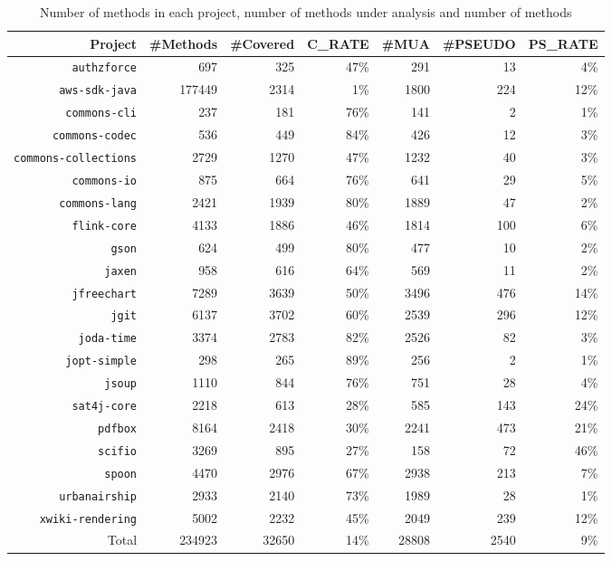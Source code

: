 \begin{table}
	\caption{Number of methods in each project, number of methods under analysis and number of \pseudotested{} methods}
	\label{tab:testedclass}
	\def\arraystretch{1}%
	\setlength\tabcolsep{1.2pt} %
	\begin{tabular}{rrrrrrr}
			\hline
			Project & {\#Methods} & {\#Covered} & C\_RATE & {\#MUA} & {\#PSEUDO}  & PS\_RATE  \\
			\hline
			\texttt{authzforce}          &    697 &  325 & 47\% &  291 &   13 &  4\% \\  
			\texttt{aws-sdk-java}        & 177449 & 2314 &  1\% & 1800 &  224 & 12\% \\
			\texttt{commons-cli}         &    237 &  181 & 76\% &  141 &    2 &  1\% \\  
			\texttt{commons-codec}       &    536 &  449 & 84\% &  426 &   12 &  3\% \\  
			\texttt{commons-collections} &   2729 & 1270 & 47\% & 1232 &   40 &  3\% \\  
			\texttt{commons-io}          &    875 &  664 & 76\% &  641 &   29 &  5\% \\  
			\texttt{commons-lang}        &   2421 & 1939 & 80\% & 1889 &   47 &  2\% \\  
			\texttt{flink-core}          &   4133 & 1886 & 46\% & 1814 &  100 &  6\% \\  
			\texttt{gson}                &    624 &  499 & 80\% &  477 &   10 &  2\% \\    
			\texttt{jaxen}               &    958 &  616 & 64\% &  569 &   11 &  2\% \\  
			\texttt{jfreechart}          &   7289 & 3639 & 50\% & 3496 &  476 & 14\% \\  
			\texttt{jgit}                &   6137 & 3702 & 60\% & 2539 &  296 & 12\% \\  
			\texttt{joda-time}           &   3374 & 2783 & 82\% & 2526 &   82 &  3\% \\  
			\texttt{jopt-simple}         &    298 &  265 & 89\% &  256 &    2 &  1\% \\  
			\texttt{jsoup}               &   1110 &  844 & 76\% &  751 &   28 &  4\% \\  
			\texttt{sat4j-core}          &   2218 &  613 & 28\% &  585 &  143 & 24\% \\  
			\texttt{pdfbox}              &   8164 & 2418 & 30\% & 2241 &  473 & 21\% \\  
			\texttt{scifio}              &   3269 &  895 & 27\% &  158 &   72 & 46\% \\  
			\texttt{spoon}               &   4470 & 2976 & 67\% & 2938 &  213 &  7\% \\  
			\texttt{urbanairship}        &   2933 & 2140 & 73\% & 1989 &   28 &  1\% \\  
			\texttt{xwiki-rendering}     &   5002 & 2232 & 45\% & 2049 &  239 & 12\% \\
			\hline
			Total               & 234923 & 32650 & 14\% & 28808 & 2540 & 9\% \\
			\hline
	\end{tabular}
\end{table}

